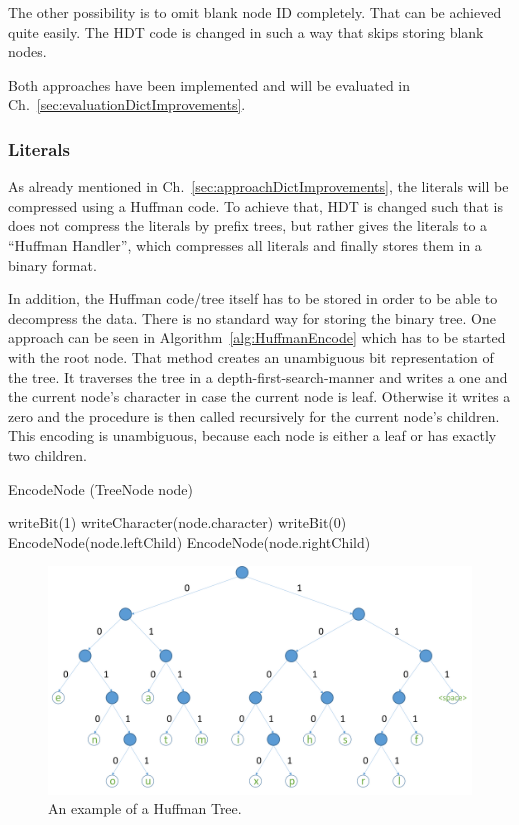 The other possibility is to omit blank node ID completely. That can be achieved quite easily. The HDT code is changed in such a way that skips storing blank nodes.

Both approaches have been implemented and will be evaluated in Ch.~\ref{sec:evaluationDictImprovements}.

\subsubsection{Literals}\label{sec:implementationLiterals}

As already mentioned in Ch.~\ref{sec:approachDictImprovements}, the literals will be compressed using a Huffman code. To achieve that, HDT is changed such that is does not compress the literals by prefix trees, but rather gives the literals to a \enquote{Huffman Handler}, which compresses all literals and finally stores them in a binary format.

In addition, the Huffman code/tree itself has to be stored in order to be able to decompress the data. There is no standard way for storing the binary tree. One approach can be seen in Algorithm~\ref{alg:HuffmanEncode} which has to be started with the root node. That method creates an unambiguous bit representation of the tree. It traverses the tree in a depth-first-search-manner and writes a one and the current node's character in case the current node is leaf. Otherwise it writes a zero and the procedure is then called recursively for the current node's children. This encoding is unambiguous, because each node is either a leaf or has exactly two children.

\begin{algorithm}
	\caption{EncodeNode (TreeNode node)}\label{alg:HuffmanEncode}
	\begin{algorithmic}[1]
		\State writeBit(1)
		\State writeCharacter(node.character)
		\Else
		\State writeBit(0)
		\State EncodeNode(node.leftChild)
		\State EncodeNode(node.rightChild)
		\EndIf
	\end{algorithmic}
\end{algorithm}

\begin{figure}
	\centering
	\includegraphics[width=0.9\linewidth]{figures/4_rdf_specific_features/huffman}
	\caption{An example of a Huffman Tree.}
	\label{fig:huffmantree}
\end{figure}


